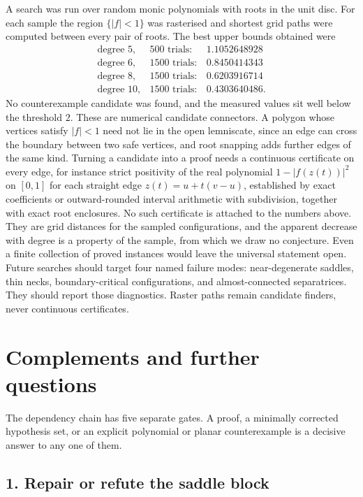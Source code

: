 \documentclass[11pt]{article}
\begin{document}
A search was run over random monic polynomials with roots in the unit disc.  For
each sample the region $\{|f|<1\}$ was rasterised and shortest grid paths were
computed between every pair of roots.  The best upper bounds obtained were
\[
  \begin{array}{lrr}
    \text{degree } 5, & 500 \text{ trials}: & 1.1052648928\\
    \text{degree } 6, & 1500 \text{ trials}: & 0.8450414343\\
    \text{degree } 8, & 1500 \text{ trials}: & 0.6203916714\\
    \text{degree } 10, & 1500 \text{ trials}: & 0.4303640486 .
  \end{array}
\]
No counterexample candidate was found, and the measured values sit well below
the threshold $2$.  These are numerical candidate connectors.  A polygon whose
vertices satisfy $|f|<1$ need not lie in the open lemniscate, since an edge can
cross the boundary between two safe vertices, and root snapping adds further
edges of the same kind.  Turning a candidate into a proof needs a continuous
certificate on every edge, for instance strict positivity of the real
polynomial $1-|f(z(t))|^2$ on $[0,1]$ for each straight edge $z(t)=u+t(v-u)$,
established by exact coefficients or outward-rounded interval arithmetic with
subdivision, together with exact root enclosures.  No such certificate is
attached to the numbers above.  They are grid distances for the sampled
configurations, and the apparent decrease with degree is a property of the
sample, from which we draw no conjecture.  Even a finite collection of proved
instances would leave the universal statement open.
Future searches should target four named failure modes: near-degenerate
saddles, thin necks, boundary-critical configurations, and almost-connected
separatrices.  They should report those diagnostics.  Raster paths remain candidate
finders, never continuous certificates.

\section{Complements and further questions}\label{sec:open}

The dependency chain has five separate gates.  A proof, a minimally corrected
hypothesis set, or an explicit polynomial or planar counterexample is a
decisive answer to any one of them.

\subsection*{1. Repair or refute the saddle block}
\end{document}
